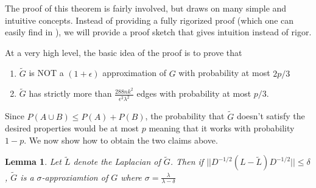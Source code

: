 \documentclass[12pt,twoside]{article}
\newtheorem{lemma}[thm]{Lemma}
\begin{document}
The proof of this theorem is fairly involved, but draws on many simple and intuitive concepts. Instead of providing a fully rigorized proof (which one can easily find in \cite{spielman-teng-spectralsparse}), we will provide a proof sketch that gives intuition instead of rigor.

At a very high level, the basic idea of the proof is to prove that

\begin{enumerate}
    \item $\tilde{G}$ is NOT a $(1 + \epsilon)$ approximation of $G$ with probability at most $2p/3$
    \item $\tilde{G}$ has strictly more than $\frac{288nk^2}{\epsilon^2\lambda^2}$ edges with probability at most $p/3$.
\end{enumerate}

Since $P(A \cup B) \leq P(A) + P(B)$, the probability that $\tilde{G}$ doesn't satisfy the desired properties would be at most $p$ meaning that it works with probability $1-p$. We now show how to obtain the two claims above. 

\begin{lemma}
Let $\tilde{L}$ denote the Laplacian of $\tilde{G}$. Then if $||D^{-1/2}(L-\tilde{L})D^{-1/2}|| \leq \delta$, $\tilde{G}$ is a $\sigma$-approxiamtion of $G$ where $\sigma = \frac{\lambda}{\lambda - \delta}$
\end{lemma}
\end{document}
